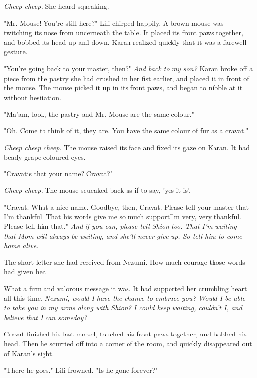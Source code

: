 \emph{Cheep-cheep.} She heard squeaking.

"Mr. Mouse! You're still here?" Lili chirped happily. A brown mouse was
twitching its nose from underneath the table. It placed its front paws
together, and bobbed its head up and down. Karan realized quickly that
it was a farewell gesture.

"You're going back to your master, then?" \emph{And back to my son?} Karan
broke off a piece from the pastry she had crushed in her fist earlier,
and placed it in front of the mouse. The mouse picked it up in its front
paws, and began to nibble at it without hesitation.

"Ma'am, look, the pastry and Mr. Mouse are the same colour."

"Oh. Come to think of it, they are. You have the same colour of fur as a
cravat."

\emph{Cheep cheep cheep.} The mouse raised its face and fixed its gaze on
Karan. It had beady grape-coloured eyes.

"Cravat\el is that your name? Cravat?"

\emph{Cheep-cheep.} The mouse squeaked back as if to say, 'yes it is'.

"Cravat. What a nice name. Goodbye, then, Cravat. Please tell your
master that I'm thankful. That his words give me so much support\el I'm
very, very thankful. Please tell him that." \emph{And if you can, please tell
Shion too. That I'm waiting---that Mom will always be waiting, and she'll
never give up. So tell him to come home alive.}


The short letter she had received from Nezumi. How much courage those
words had given her.


What a firm and valorous message it was. It had supported her crumbling
heart all this time. \emph{Nezumi, would I have the chance to embrace you?
Would I be able to take you in my arms along with Shion? I could keep
waiting, couldn't I, and believe that I can someday?}

Cravat finished his last morsel, touched his front paws together, and
bobbed his head. Then he scurried off into a corner of the room, and
quickly disappeared out of Karan's sight.

"There he goes." Lili frowned. "Is he gone forever?"

